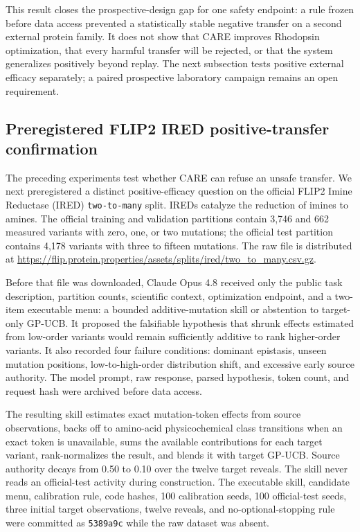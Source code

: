 \documentclass[pdflatex,sn-nature]{sn-jnl}
\newcommand{\code}[1]{\texttt{#1}}
\begin{document}
\begin{appendices}
This result closes the prospective-design gap for one safety endpoint: a rule
frozen before data access prevented a statistically stable negative transfer on
a second external protein family. It does not show that CARE improves Rhodopsin
optimization, that every harmful transfer will be rejected, or that the system
generalizes positively beyond replay. The next subsection tests positive
external efficacy separately; a paired prospective laboratory campaign remains
an open requirement.

\subsection{Preregistered FLIP2 IRED positive-transfer confirmation}
\label{sec:flip2_ired_positive}

The preceding experiments test whether CARE can refuse an unsafe transfer. We
next preregistered a distinct positive-efficacy question on the official FLIP2
Imine Reductase (IRED) \code{two-to-many} split. IREDs catalyze the reduction of
imines to amines. The official training and validation partitions contain 3,746
and 662 measured variants with zero, one, or two mutations; the official test
partition contains 4,178 variants with three to fifteen mutations. The raw file
is distributed at
\url{https://flip.protein.properties/assets/splits/ired/two_to_many.csv.gz}.

Before that file was downloaded, Claude Opus 4.8 received only the public task
description, partition counts, scientific context, optimization endpoint, and
a two-item executable menu: a bounded additive-mutation skill or abstention to
target-only GP-UCB. It proposed the falsifiable hypothesis that shrunk effects
estimated from low-order variants would remain sufficiently additive to rank
higher-order variants. It also recorded four failure conditions: dominant
epistasis, unseen mutation positions, low-to-high-order distribution shift, and
excessive early source authority. The model prompt, raw response, parsed
hypothesis, token count, and request hash were archived before data access.

The resulting skill estimates exact mutation-token effects from source
observations, backs off to amino-acid physicochemical class transitions when an
exact token is unavailable, sums the available contributions for each target
variant, rank-normalizes the result, and blends it with target GP-UCB. Source
authority decays from 0.50 to 0.10 over the twelve target reveals. The skill
never reads an official-test activity during construction. The executable
skill, candidate menu, calibration rule, code hashes, 100 calibration seeds,
100 official-test seeds, three initial target observations, twelve reveals,
and no-optional-stopping rule were committed as \code{5389a9c} while the raw
dataset was absent.


\end{appendices}
\end{document}
